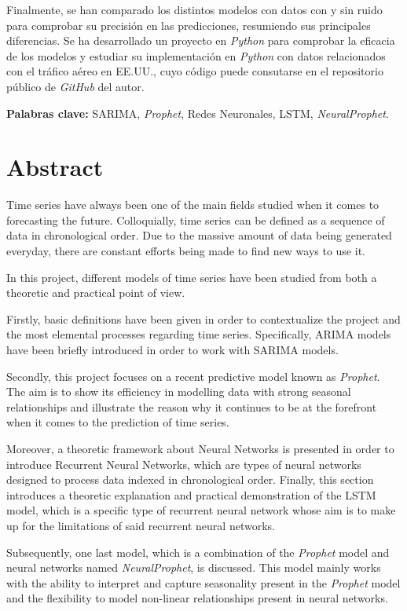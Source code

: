 \documentclass[12pt,twoside]{article}
\begin{document}
Finalmente, se han comparado los distintos modelos con datos con y sin ruido para comprobar su precisión en las predicciones, resumiendo sus principales diferencias. Se ha desarrollado un proyecto en \textit{Python} para comprobar la eficacia de los modelos y estudiar su implementación en \textit{Python} con datos relacionados con el tráfico aéreo en EE.UU., cuyo código puede consutarse en el repositorio público de \textit{GitHub} del autor.

\textbf{Palabras clave:} SARIMA, \textit{Prophet}, Redes Neuronales, LSTM, \textit{NeuralProphet}.

\newpage

\section*{Abstract}

Time series have always been one of the main fields studied when it comes to forecasting the future. Colloquially, time series can be defined as a sequence of data in chronological order. Due to the massive amount of data being generated everyday, there are constant efforts being made to find new ways to use it.

In this project, different models of time series have been studied from both a theoretic and practical point of view. 

Firstly, basic definitions have been given in order to contextualize the project and the most elemental processes regarding time series. Specifically, ARIMA models have been briefly introduced in order to work with SARIMA models. 

Secondly, this project focuses on a recent predictive model known as \textit{Prophet}. The aim is to show its efficiency in modelling data with strong seasonal relationships and illustrate the reason why it continues to be at the forefront when it comes to the prediction of time series. 

Moreover, a theoretic framework about Neural Networks is presented in order to introduce Recurrent Neural Networks, which are types of neural networks designed to process data indexed in chronological order. Finally, this section introduces a theoretic explanation and practical demonstration of the LSTM model, which is a specific type of recurrent neural network whose aim is to make up for the limitations of said recurrent neural networks. 

Subsequently, one last model, which is a combination of the \textit{Prophet} model and neural networks named \textit{NeuralProphet}, is discussed. This model mainly works with the ability to interpret and capture seasonality present in the \textit{Prophet} model and the flexibility to model non-linear relationships present in neural networks. 
\end{document}
